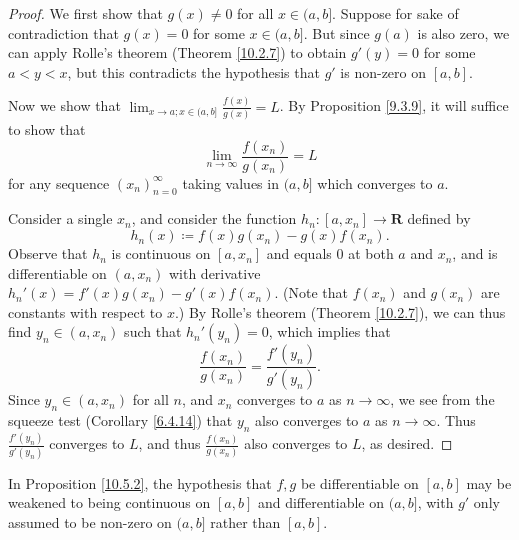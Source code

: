 \begin{proof}
    We first show that \(g(x) \neq 0\) for all \(x \in (a, b]\).
    Suppose for sake of contradiction that \(g(x) = 0\) for some \(x \in (a, b]\).
    But since \(g(a)\) is also zero, we can apply Rolle's theorem (Theorem \ref{10.2.7}) to obtain \(g'(y) = 0\) for some \(a < y < x\), but this contradicts the hypothesis that \(g'\) is non-zero on \([a, b]\).

    Now we show that \(\lim_{x \to a ; x \in (a, b]} \frac{f(x)}{g(x)} = L\).
    By Proposition \ref{9.3.9}, it will suffice to show that
    \[
        \lim_{n \to \infty} \frac{f(x_n)}{g(x_n)} = L
    \]
    for any sequence \((x_n)_{n = 0}^\infty\) taking values in \((a, b]\) which converges to \(a\).

    Consider a single \(x_n\), and consider the function \(h_n : [a, x_n] \to \mathbf{R}\) defined by
    \[
        h_n(x) \coloneqq f(x) g(x_n) - g(x) f(x_n).
    \]
    Observe that \(h_n\) is continuous on \([a, x_n]\) and equals \(0\) at both \(a\) and \(x_n\), and is differentiable on \((a, x_n)\) with derivative \(h_n'(x) = f'(x) g(x_n) - g'(x) f(x_n)\).
    (Note that \(f(x_n)\) and \(g(x_n)\) are constants with respect to \(x\).)
    By Rolle's theorem (Theorem \ref{10.2.7}), we can thus find \(y_n \in (a, x_n)\) such that \(h_n'(y_n) = 0\), which implies that
    \[
        \frac{f(x_n)}{g(x_n)} = \frac{f'(y_n)}{g'(y_n)}.
    \]
    Since \(y_n \in (a, x_n)\) for all \(n\), and \(x_n\) converges to \(a\) as \(n \to \infty\), we see from the squeeze test (Corollary \ref{6.4.14}) that \(y_n\) also converges to \(a\) as \(n \to \infty\).
    Thus \(\frac{f'(y_n)}{g'(y_n)}\) converges to \(L\), and thus \(\frac{f(x_n)}{g(x_n)}\) also converges to \(L\), as desired.
\end{proof}

\begin{note}
    In Proposition \ref{10.5.2}, the hypothesis that \(f, g\) be differentiable on \([a, b]\) may be weakened to being continuous on \([a, b]\) and differentiable on \((a, b]\), with \(g'\) only assumed to be non-zero on \((a, b]\) rather than \([a, b]\).
\end{note}